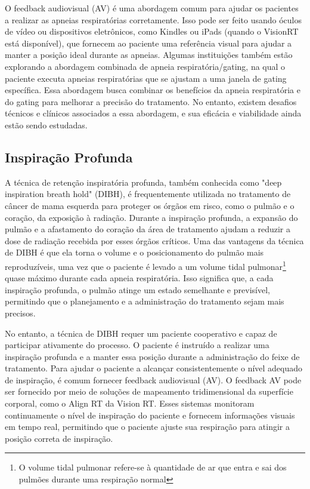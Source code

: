 \documentclass[11pt,a4paper]{article}
\begin{document}
	O feedback audiovisual (AV) é uma abordagem comum para ajudar os pacientes a realizar as apneias respiratórias corretamente. Isso pode ser feito usando óculos de vídeo ou dispositivos eletrônicos, como Kindles ou iPads (quando o VisionRT está disponível), que fornecem ao paciente uma referência visual para ajudar a manter a posição ideal durante as apneias. Algumas instituições também estão explorando a abordagem combinada de apneia respiratória/gating, na qual o paciente executa apneias respiratórias que se ajustam a uma janela de gating específica. Essa abordagem busca combinar os benefícios da apneia respiratória e do gating para melhorar a precisão do tratamento. No entanto, existem desafios técnicos e clínicos associados a essa abordagem, e sua eficácia e viabilidade ainda estão sendo estudadas.

\subsection*{Inspiração Profunda}

	A técnica de retenção inspiratória profunda, também conhecida como "deep inspiration breath hold" (DIBH), é frequentemente utilizada no tratamento de câncer de mama esquerda para proteger os órgãos em risco, como o pulmão e o coração, da exposição à radiação. Durante a inspiração profunda, a expansão do pulmão e a afastamento do coração da área de tratamento ajudam a reduzir a dose de radiação recebida por esses órgãos críticos. Uma das vantagens da técnica de DIBH é que ela torna o volume e o posicionamento do pulmão mais reproduzíveis, uma vez que o paciente é levado a um volume tidal pulmonar\footnote{O volume tidal pulmonar refere-se à quantidade de ar que entra e sai dos pulmões durante uma respiração normal} quase máximo durante cada apneia respiratória. Isso significa que, a cada inspiração profunda, o pulmão atinge um estado semelhante e previsível, permitindo que o planejamento e a administração do tratamento sejam mais precisos.

	No entanto, a técnica de DIBH requer um paciente cooperativo e capaz de participar ativamente do processo. O paciente é instruído a realizar uma inspiração profunda e a manter essa posição durante a administração do feixe de tratamento. Para ajudar o paciente a alcançar consistentemente o nível adequado de inspiração, é comum fornecer feedback audiovisual (AV). O feedback AV pode ser fornecido por meio de soluções de mapeamento tridimensional da superfície corporal, como o Align RT da Vision RT. Esses sistemas monitoram continuamente o nível de inspiração do paciente e fornecem informações visuais em tempo real, permitindo que o paciente ajuste sua respiração para atingir a posição correta de inspiração.
\end{document}

